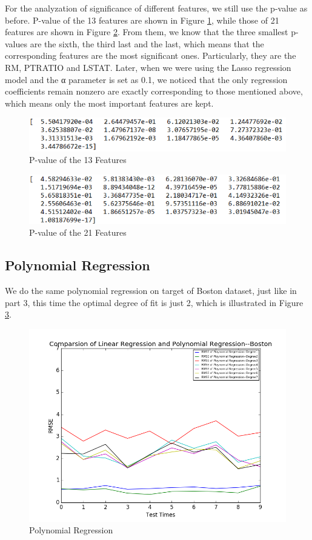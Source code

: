 \documentclass{article}
\begin{document}
For the analyzation of significance of different features, we still use the p-value as before.  P-value of the 13 features are shown in Figure \ref{fig:feature13}, while those of 21 features are shown in Figure \ref{fig:feature21}. From them, we know that the three smallest p-values are the sixth, the third last and the last, which means that the corresponding features are the most significant ones. Particularly, they are the RM, PTRATIO and LSTAT. Later, when we were using the Lasso regression model and the α parameter is set as 0.1, we noticed that the only regression coefficients remain nonzero are exactly corresponding to those mentioned above, which means only the most important features are kept.
\begin{figure}[htbp]
\centering
\includegraphics[width=.6\textwidth]{feature13.png}
\caption{P-value of the 13 Features}
\label{fig:feature13}
\end{figure}
\begin{figure}[htbp]
\centering
\includegraphics[width=.6\textwidth]{feature21.png}
\caption{P-value of the 21 Features}
\label{fig:feature21}
\end{figure}
\subsection{Polynomial Regression}
We do the same polynomial regression on target of Boston dataset, just like in part 3, this time the optimal degree of fit is just 2, which is illustrated in Figure \ref{fig:problem4-2}.
\begin{figure}[htbp]
\centering
\includegraphics[width=.6\textwidth]{problem4-2.png}
\caption{Polynomial Regression}
\label{fig:problem4-2}
\end{figure}
\end{document}
